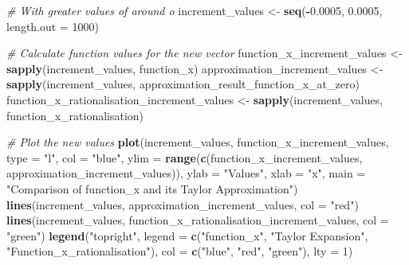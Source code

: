 \documentclass[
]{article}
\newenvironment{Shaded}{\begin{snugshade}}{\end{snugshade}}
\newcommand{\AttributeTok}[1]{\textcolor[rgb]{0.13,0.29,0.53}{#1}}
\newcommand{\CommentTok}[1]{\textcolor[rgb]{0.56,0.35,0.01}{\textit{#1}}}
\newcommand{\DecValTok}[1]{\textcolor[rgb]{0.00,0.00,0.81}{#1}}
\newcommand{\FloatTok}[1]{\textcolor[rgb]{0.00,0.00,0.81}{#1}}
\newcommand{\FunctionTok}[1]{\textcolor[rgb]{0.13,0.29,0.53}{\textbf{#1}}}
\newcommand{\NormalTok}[1]{#1}
\newcommand{\OtherTok}[1]{\textcolor[rgb]{0.56,0.35,0.01}{#1}}
\newcommand{\SpecialCharTok}[1]{\textcolor[rgb]{0.81,0.36,0.00}{\textbf{#1}}}
\newcommand{\StringTok}[1]{\textcolor[rgb]{0.31,0.60,0.02}{#1}}
\begin{document}
\begin{Shaded}
\begin{Highlighting}[]
\CommentTok{\# With greater values of around o}
\NormalTok{increment\_values }\OtherTok{\textless{}{-}} \FunctionTok{seq}\NormalTok{(}\SpecialCharTok{{-}}\FloatTok{0.0005}\NormalTok{, }\FloatTok{0.0005}\NormalTok{, }\AttributeTok{length.out =} \DecValTok{1000}\NormalTok{)}

\CommentTok{\# Calculate function values for the new vector}
\NormalTok{function\_x\_increment\_values }\OtherTok{\textless{}{-}} \FunctionTok{sapply}\NormalTok{(increment\_values, function\_x)}
\NormalTok{approximation\_increment\_values }\OtherTok{\textless{}{-}} \FunctionTok{sapply}\NormalTok{(increment\_values, approximation\_result\_function\_x\_at\_zero)}
\NormalTok{function\_x\_rationalisation\_increment\_values }\OtherTok{\textless{}{-}} \FunctionTok{sapply}\NormalTok{(increment\_values, function\_x\_rationalisation)}

\CommentTok{\# Plot the new values}
\FunctionTok{plot}\NormalTok{(increment\_values, function\_x\_increment\_values, }\AttributeTok{type =} \StringTok{"l"}\NormalTok{, }\AttributeTok{col =} \StringTok{"blue"}\NormalTok{, }\AttributeTok{ylim =} \FunctionTok{range}\NormalTok{(}\FunctionTok{c}\NormalTok{(function\_x\_increment\_values, approximation\_increment\_values)), }\AttributeTok{ylab =} \StringTok{"Values"}\NormalTok{, }\AttributeTok{xlab =} \StringTok{"x"}\NormalTok{, }\AttributeTok{main =} \StringTok{"Comparison of function\_x and its Taylor Approximation"}\NormalTok{)}
\FunctionTok{lines}\NormalTok{(increment\_values, approximation\_increment\_values, }\AttributeTok{col =} \StringTok{"red"}\NormalTok{)}
\FunctionTok{lines}\NormalTok{(increment\_values, function\_x\_rationalisation\_increment\_values, }\AttributeTok{col =} \StringTok{"green"}\NormalTok{)}
\FunctionTok{legend}\NormalTok{(}\StringTok{"topright"}\NormalTok{, }\AttributeTok{legend =} \FunctionTok{c}\NormalTok{(}\StringTok{"function\_x"}\NormalTok{, }\StringTok{"Taylor Expansion"}\NormalTok{, }\StringTok{"Function\_x\_rationalisation"}\NormalTok{), }\AttributeTok{col =} \FunctionTok{c}\NormalTok{(}\StringTok{"blue"}\NormalTok{, }\StringTok{"red"}\NormalTok{, }\StringTok{"green"}\NormalTok{), }\AttributeTok{lty =} \DecValTok{1}\NormalTok{)}
\end{Highlighting}
\end{Shaded}
\end{document}
